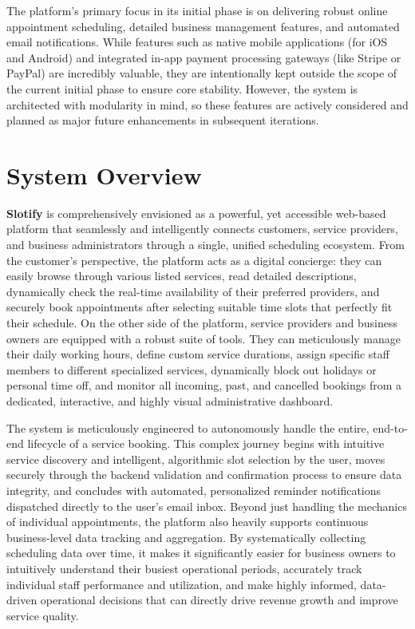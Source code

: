 The platform's primary focus in its initial phase is on delivering robust online appointment scheduling, detailed business management features, and automated email notifications. While features such as native mobile applications (for iOS and Android) and integrated in-app payment processing gateways (like Stripe or PayPal) are incredibly valuable, they are intentionally kept outside the scope of the current initial phase to ensure core stability. However, the system is architected with modularity in mind, so these features are actively considered and planned as major future enhancements in subsequent iterations.

\section{System Overview}
\textbf{Slotify} is comprehensively envisioned as a powerful, yet accessible web-based platform that seamlessly and intelligently connects customers, service providers, and business administrators through a single, unified scheduling ecosystem. From the customer's perspective, the platform acts as a digital concierge: they can easily browse through various listed services, read detailed descriptions, dynamically check the real-time availability of their preferred providers, and securely book appointments after selecting suitable time slots that perfectly fit their schedule. On the other side of the platform, service providers and business owners are equipped with a robust suite of tools. They can meticulously manage their daily working hours, define custom service durations, assign specific staff members to different specialized services, dynamically block out holidays or personal time off, and monitor all incoming, past, and cancelled bookings from a dedicated, interactive, and highly visual administrative dashboard.

The system is meticulously engineered to autonomously handle the entire, end-to-end lifecycle of a service booking. This complex journey begins with intuitive service discovery and intelligent, algorithmic slot selection by the user, moves securely through the backend validation and confirmation process to ensure data integrity, and concludes with automated, personalized reminder notifications dispatched directly to the user's email inbox. Beyond just handling the mechanics of individual appointments, the platform also heavily supports continuous business-level data tracking and aggregation. By systematically collecting scheduling data over time, it makes it significantly easier for business owners to intuitively understand their busiest operational periods, accurately track individual staff performance and utilization, and make highly informed, data-driven operational decisions that can directly drive revenue growth and improve service quality.

